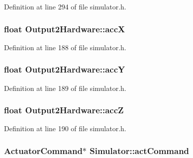 \-Definition at line 294 of file simulator.\-h.

\hypertarget{group___h_i_t_l_plugin_gaf15a299d1ff6f64a04c72d9ef5bf3860}{
\subsubsection[{acc\-X}]{\setlength{\rightskip}{0pt plus 5cm}float {\bf \-Output2\-Hardware\-::acc\-X}}}\label{group___h_i_t_l_plugin_gaf15a299d1ff6f64a04c72d9ef5bf3860}


\-Definition at line 188 of file simulator.\-h.

\hypertarget{group___h_i_t_l_plugin_ga3ce16295c4d5bfc0a4938f0120d946c4}{
\subsubsection[{acc\-Y}]{\setlength{\rightskip}{0pt plus 5cm}float {\bf \-Output2\-Hardware\-::acc\-Y}}}\label{group___h_i_t_l_plugin_ga3ce16295c4d5bfc0a4938f0120d946c4}


\-Definition at line 189 of file simulator.\-h.

\hypertarget{group___h_i_t_l_plugin_ga8565b780814dd8fddf28e4018256356a}{
\subsubsection[{acc\-Z}]{\setlength{\rightskip}{0pt plus 5cm}float {\bf \-Output2\-Hardware\-::acc\-Z}}}\label{group___h_i_t_l_plugin_ga8565b780814dd8fddf28e4018256356a}


\-Definition at line 190 of file simulator.\-h.

\hypertarget{group___h_i_t_l_plugin_ga9362d7e2619934460d6f8070496d336f}{
\subsubsection[{act\-Command}]{\setlength{\rightskip}{0pt plus 5cm}\-Actuator\-Command$\ast$ {\bf \-Simulator\-::act\-Command}}}\label{group___h_i_t_l_plugin_ga9362d7e2619934460d6f8070496d336f}


